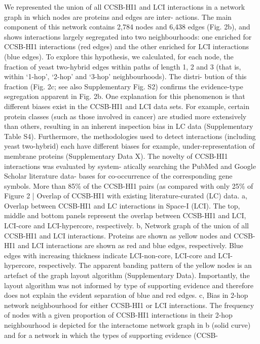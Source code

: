 We represented the union of all CCSB-HI1 and LCI interactions in
a network graph in which nodes are proteins and edges are inter-
actions. The main component of this network contains 2,784 nodes
and 6,438 edges (Fig. 2b), and shows interactions largely segregated
into two neighbourhoods: one enriched for CCSB-HI1 interactions
(red edges) and the other enriched for LCI interactions (blue edges).
To explore this hypothesis, we calculated, for each node, the fraction
of yeast two-hybrid edges within paths of length 1, 2 and 3 (that is,
within ‘1-hop’, ‘2-hop’ and ‘3-hop’ neighbourhoods). The distri-
bution of this fraction (Fig. 2c; see also Supplementary Fig. S2)
conﬁrms the evidence-type segregation apparent in Fig. 2b. One
explanation for this phenomenon is that different biases exist in the
CCSB-HI1 and LCI data sets. For example, certain protein classes
(such as those involved in cancer) are studied more extensively
than others, resulting in an inherent inspection bias in LC data
(Supplementary Table S4). Furthermore, the methodologies used to
detect interactions (including yeast two-hybrid) each have different
biases for example, under-representation of membrane proteins
(Supplementary Data X).
The novelty of CCSB-HI1 interactions was evaluated by system-
atically searching the PubMed and Google Scholar literature data-
bases for co-occurrence of the corresponding gene symbols. More
than 85\% of the CCSB-HI1 pairs (as compared with only 25\% of
Figure 2 | Overlap of CCSB-HI1 with existing literature-curated (LC)
data. a, Overlap between CCSB-HI1 and LC interactions in Space-I (LCI).
The top, middle and bottom panels represent the overlap between
CCSB-HI1 and LCI, LCI-core and LCI-hypercore, respectively. b, Network
graph of the union of all CCSB-HI1 and LCI interactions. Proteins are shown
as yellow nodes and CCSB-HI1 and LCI interactions are shown as red and
blue edges, respectively. Blue edges with increasing thickness indicate
LCI-non-core, LCI-core and LCI-hypercore, respectively. The apparent
banding pattern of the yellow nodes is an artefact of the graph layout
algorithm (Supplementary Data). Importantly, the layout algorithm was not
informed by type of supporting evidence and therefore does not explain the
evident separation of blue and red edges. c, Bias in 2-hop network
neighbourhood for either CCSB-HI1 or LCI interactions. The frequency of
nodes with a given proportion of CCSB-HI1 interactions in their 2-hop
neighbourhood is depicted for the interactome network graph in b (solid
curve) and for a network in which the types of supporting evidence (CCSB-
